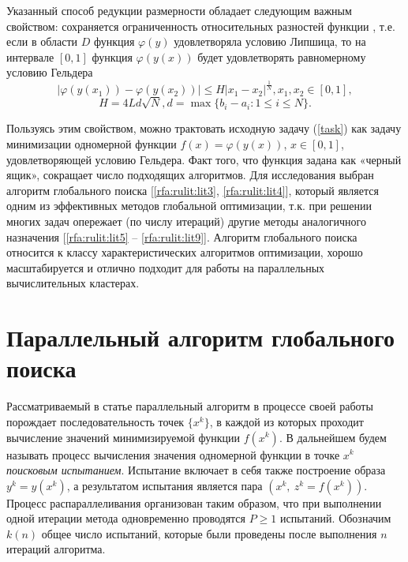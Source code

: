 \documentclass[10pt,a4paper]{book}
\begin{document}
Указанный способ редукции размерности обладает следующим важным свойством: сохраняется ограниченность относительных разностей функции , т.е. если в области $D$ функция $\varphi(y)$ удовлетворяла условию Липшица, то на интервале $[0,1]$ функция $\varphi(y(x))$ будет удовлетворять равномерному условию Гельдера
\begin{equation}
\label{holder}
\left|\varphi(y(x_1))-\varphi(y(x_2))\right|\leqslant H{\left|x_1-x_2\right|}^{\frac{1}{N}}, 
 x_1,x_2\in[0,1],
\end{equation}
\begin{equation}
H=4Ld\sqrt{N},d=\max\{b_i-a_i:1\leqslant i\leqslant N\}.
\end{equation}
 
 
Пользуясь этим свойством, можно трактовать исходную задачу (\ref{task}) как задачу минимизации одномерной функции $f\left(x\right)=\varphi\left(y\left(x\right)\right)$, $x\in[0,1]$, удовлетворяющей условию Гельдера. %
Факт того, что функция задана как «черный ящик», сокращает число подходящих алгоритмов. 
Для исследования выбран алгоритм глобального поиска [\ref{rfa:rulit:lit3}, \ref{rfa:rulit:lit4}], который является одним из эффективных методов глобальной оптимизации, т.к. при решении многих задач опережает (по числу итераций) другие методы аналогичного назначения [\ref{rfa:rulit:lit5} – \ref{rfa:rulit:lit9}]. Алгоритм глобального поиска относится к классу характеристических алгоритмов оптимизации, хорошо масштабируется и отлично подходит для работы на параллельных вычислительных кластерах. 

\section{Параллельный алгоритм глобального поиска}

Рассматриваемый в статье параллельный алгоритм в процессе своей работы порождает последовательность точек $\{x^k\}$, в каждой из которых проходит вычисление значений минимизируемой функции $f(x^k)$. В дальнейшем будем называть процесс вычисления значения одномерной функции в точке $x^k$ \textit{поисковым испытанием}. Испытание включает в себя также построение образа $y^k=y(x^k)$, а результатом испытания является пара $(x^k,\ z^k=f(x^k))$. Процесс распараллеливания организован таким образом, что при выполнении одной итерации метода одновременно проводятся $P\geq1$ испытаний. Обозначим $k(n)$ общее число испытаний, которые были проведены после выполнения $n$ итераций алгоритма. 
\end{document}
